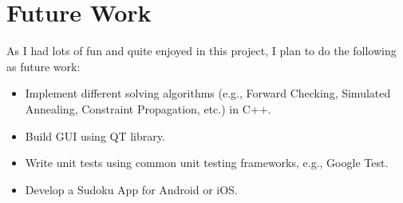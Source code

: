 \documentclass[12pt,a4paper]{article}
\begin{document}


\section{Future Work}
As I had lots of fun and quite enjoyed in this project, I plan to do the following as future work:
\begin{itemize}
	\item Implement different solving algorithms (e.g., Forward Checking, Simulated Annealing, Constraint Propagation, etc.) in C++.
	\item Build GUI using QT library.
	\item Write unit tests using common unit testing frameworks, e.g., Google Test.
	\item Develop a Sudoku App for Android or iOS.
\end{itemize}


\newpage %
\nocite{*}   %
\printbibliography[heading=bibintoc]
\end{document}
